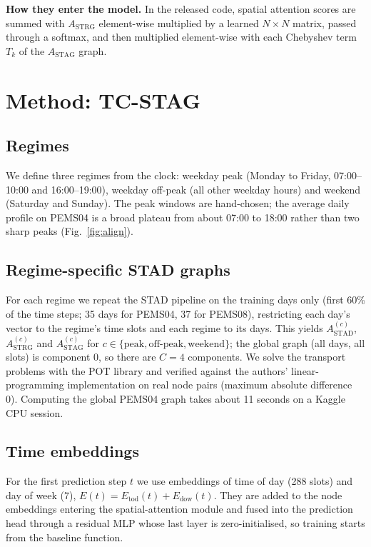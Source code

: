 \documentclass[conference]{IEEEtran}
\begin{document}
\textbf{How they enter the model.} In the released code, spatial attention scores are summed with $A_{\mathrm{STRG}}$ element-wise multiplied by a learned $N\times N$ matrix, passed through a softmax, and then multiplied element-wise with each Chebyshev term $T_k$ of the $A_{\mathrm{STAG}}$ graph.

\section{Method: TC-STAG}\label{sec:method}
\subsection{Regimes}
We define three regimes from the clock: weekday peak (Monday to Friday, 07:00--10:00 and 16:00--19:00), weekday off-peak (all other weekday hours) and weekend (Saturday and Sunday). The peak windows are hand-chosen; the average daily profile on PEMS04 is a broad plateau from about 07:00 to 18:00 rather than two sharp peaks (Fig.~\ref{fig:align}).

\subsection{Regime-specific STAD graphs}
For each regime we repeat the STAD pipeline on the training days only (first 60\% of the time steps; 35 days for PEMS04, 37 for PEMS08), restricting each day's vector to the regime's time slots and each regime to its days. This yields $A^{(c)}_{\mathrm{STAD}}$, $A^{(c)}_{\mathrm{STRG}}$ and $A^{(c)}_{\mathrm{STAG}}$ for $c\in\{\text{peak},\text{off-peak},\text{weekend}\}$; the global graph (all days, all slots) is component 0, so there are $C=4$ components. We solve the transport problems with the POT library \cite{flamary2021pot} and verified against the authors' linear-programming implementation on real node pairs (maximum absolute difference 0). Computing the global PEMS04 graph takes about 11 seconds on a Kaggle CPU session.

\subsection{Time embeddings}
For the first prediction step $t$ we use embeddings of time of day (288 slots) and day of week (7), $E(t)=E_{\mathrm{tod}}(t)+E_{\mathrm{dow}}(t)$. They are added to the node embeddings entering the spatial-attention module and fused into the prediction head through a residual MLP whose last layer is zero-initialised, so training starts from the baseline function.
\end{document}
